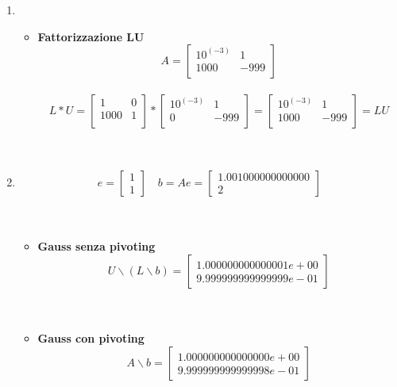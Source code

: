 \begin{enumerate}
\item 
\begin{itemize}
\item \textbf{Fattorizzazione LU}
\[
A =\begin{bmatrix}
	10^{(-3)} &   1  \\
	 1000   & -999 \\
\end{bmatrix}
\]\\
\[
L*U =\begin{bmatrix}
	1    & 0 \\
	1000 & 1 \\
\end{bmatrix} *
\begin{bmatrix}
	10^{(-3)} & 1    \\
	0       & -999 \\
\end{bmatrix} 
= \begin{bmatrix}
	10^{(-3)} &   1  \\
	 1000   & -999 \\
\end{bmatrix} = LU
\]\\\
\end{itemize}
\item
\[
e = \begin{bmatrix}
	1 \\
	1
\end{bmatrix} \quad 
b = Ae =\begin{bmatrix}
	1.001000000000000 \\
	2                 
\end{bmatrix}
\]\\\
\begin{itemize}
\item \textbf{Gauss senza pivoting}
\[
U \backslash (L \backslash b) = \begin{bmatrix}
	1.000000000000001e+00 \\
    9.999999999999999e-01
\end{bmatrix}
\]\\\
\end{itemize}
\begin{itemize}
\item \textbf{Gauss con pivoting}
\[
A \backslash b =\begin{bmatrix}
	1.000000000000000e+00 \\
    9.999999999999998e-01 
\end{bmatrix}
\]
\end{itemize}
\end{enumerate}